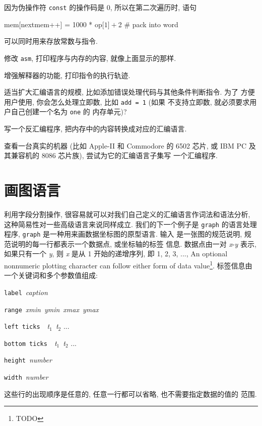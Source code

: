 因为伪操作符 \texttt{const} 的操作码是 0, 所以在第二次遍历时, 语句
\begin{awkcode}
    mem[nextmem++] = 1000 * op[$1] + $2  # pack into word
\end{awkcode}
可以同时用来存放常数与指令.

\begin{exercise}
    修改 \texttt{asm}, 打印程序与内存的内容, 就像上面显示的那样.
\end{exercise}

\begin{exercise}
    增强解释器的功能, 打印指令的执行轨迹.
\end{exercise}

\begin{exercise}
    适当扩大汇编语言的规模, 比如添加错误处理代码与其他条件判断指令. 为了 
    方便用户使用, 你会怎么处理立即数, 比如 \texttt{add = 1} (如果 
    不支持立即数, 就必须要求用户自己创建一个名为 \texttt{one} 的
    内存单元)?
\end{exercise}

\begin{exercise}
    写一个反汇编程序, 把内存中的内容转换成对应的汇编语言.
\end{exercise}

\begin{exercise}
    查看一台真实的机器 (比如 Apple-II 和 Commodore 的 6502 芯片, 或
    IBM PC 及其兼容机的 8086 芯片族), 尝试为它的汇编语言子集写
    一个汇编程序.
\end{exercise}

\section{画图语言}
\label{sec:a_language_for_drawing_graphs}

利用字段分割操作, 很容易就可以对我们自己定义的汇编语言作词法和语法分析,
这种简易性对一些高级语言来说同样成立. 我们的下一个例子是 \texttt{graph} 
的语言处理程序, \texttt{graph} 是一种用来画数据坐标图的原型语言. 输入
是一张图的规范说明, 规范说明的每一行都表示一个数据点, 或坐标轴的标签
信息. 数据点由一对 \textit{x}-\textit{y} 表示, 如果只有一个 \textit{y},
则 \textit{x} 是从 1 开始的递增序列, 即 1, 2, 3, ..., 
An optional nonnumeric plotting character can follow either form of data
value\footnote{TODO}. 标签信息由一个关键词和多个参数值组成:
\begin{pattern}
\indent\texttt{label}\ \textit{caption} \par
\indent\texttt{range}\ \textit{xmin}\ \textit{ymin}\ \textit{xmax}\
    \textit{ymax} \par 
\indent\texttt{left ticks}\ \ \textit{t}$_1$\ \textit{t}$_2$ ... \par 
\indent\texttt{bottom ticks}\ \ \textit{t}$_1$\ \textit{t}$_2$ ... \par 
\indent\texttt{height}\ \textit{number}\par
\indent\texttt{width}\ \textit{number}\par
\end{pattern}
这些行的出现顺序是任意的, 任意一行都可以省略, 也不需要指定数据的值的
范围.

